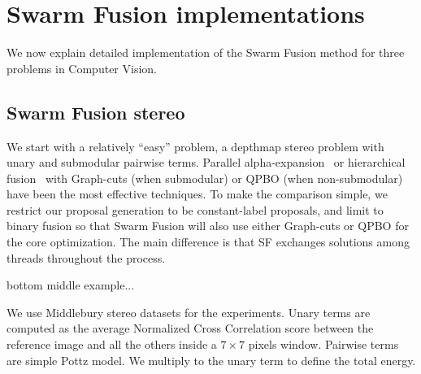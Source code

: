 \section{Swarm Fusion implementations}
We now explain detailed implementation of the Swarm Fusion method for
three problems in Computer Vision.

\subsection{Swarm Fusion stereo}
We start with a relatively ``easy'' problem, a depthmap stereo problem
with unary and submodular pairwise terms. Parallel
alpha-expansion~\cite{delong} or hierarchical fusion~\cite{delong,olga}
with Graph-cuts (when submodular) or QPBO (when non-submodular) have
been the most effective techniques.
%
To make the comparison simple, we restrict our proposal generation to be
constant-label proposals, and limit to binary fusion so that Swarm
Fusion will also use either Graph-cuts or QPBO for the core
optimization. The main difference is that SF exchanges solutions among
threads throughout the process.


bottom middle example...

%
We use Middlebury stereo datasets for the experiments. Unary terms are
computed as the average Normalized Cross Correlation score between the
reference image and all the others inside a $7\times 7$ pixels
window. Pairwise terms are simple Pottz model. We multiply  to the unary term to define the total energy.


